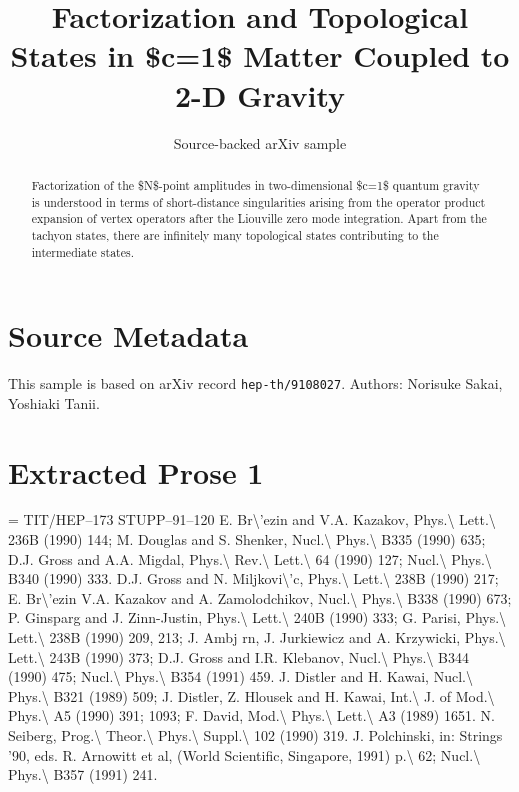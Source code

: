 \documentclass[11pt]{article}
\title{Factorization and Topological States in \$c=1\$ Matter Coupled to 2-D
  Gravity}
\author{Source-backed arXiv sample}
\date{}
\begin{document}
\maketitle
\begin{abstract}
Factorization of the \$N\$-point amplitudes in two-dimensional \$c=1\$ quantum gravity is understood in terms of short-distance singularities arising from the operator product expansion of vertex operators after the Liouville zero mode integration. Apart from the tachyon states, there are infinitely many topological states contributing to the intermediate states.
\end{abstract}
\section{Source Metadata}
This sample is based on arXiv record \texttt{hep-th/9108027}. Authors: Norisuke Sakai, Yoshiaki Tanii.
\section{Extracted Prose 1}
= TIT/HEP--173 STUPP--91--120 E. Br\textbackslash{}'ezin and V.A. Kazakov, Phys.\textbackslash{} Lett.\textbackslash{} 236B (1990) 144; M. Douglas and S. Shenker, Nucl.\textbackslash{} Phys.\textbackslash{} B335 (1990) 635; D.J. Gross and A.A. Migdal, Phys.\textbackslash{} Rev.\textbackslash{} Lett.\textbackslash{} 64 (1990) 127; Nucl.\textbackslash{} Phys.\textbackslash{} B340 (1990) 333. D.J. Gross and N. Miljkovi\textbackslash{}'c, Phys.\textbackslash{} Lett.\textbackslash{} 238B (1990) 217; E. Br\textbackslash{}'ezin V.A. Kazakov and A. Zamolodchikov, Nucl.\textbackslash{} Phys.\textbackslash{} B338 (1990) 673; P. Ginsparg and J. Zinn-Justin, Phys.\textbackslash{} Lett.\textbackslash{} 240B (1990) 333; G. Parisi, Phys.\textbackslash{} Lett.\textbackslash{} 238B (1990) 209, 213; J. Ambj rn, J. Jurkiewicz and A. Krzywicki, Phys.\textbackslash{} Lett.\textbackslash{} 243B (1990) 373; D.J. Gross and I.R. Klebanov, Nucl.\textbackslash{} Phys.\textbackslash{} B344 (1990) 475; Nucl.\textbackslash{} Phys.\textbackslash{} B354 (1991) 459. J. Distler and H. Kawai, Nucl.\textbackslash{} Phys.\textbackslash{} B321 (1989) 509; J. Distler, Z. Hlousek and H. Kawai, Int.\textbackslash{} J. of Mod.\textbackslash{} Phys.\textbackslash{} A5 (1990) 391; 1093; F. David, Mod.\textbackslash{} Phys.\textbackslash{} Lett.\textbackslash{} A3 (1989) 1651. N. Seiberg, Prog.\textbackslash{} Theor.\textbackslash{} Phys.\textbackslash{} Suppl.\textbackslash{} 102 (1990) 319. J. Polchinski, in: Strings '90, eds. R. Arnowitt et al, (World Scientific, Singapore, 1991) p.\textbackslash{} 62; Nucl.\textbackslash{} Phys.\textbackslash{} B357 (1991) 241.
\end{document}
